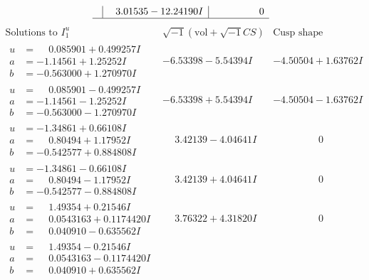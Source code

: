 \documentclass[1p]{elsarticle_modified}
\theoremstyle{definition}
\newcommand{\I}{\sqrt{-1}}
\begin{document}
$$\begin{array}{c|c|c}
 & \phantom{-}3.01535 - 12.24190 I & \phantom{-0.000000 } 0\\
 \hline 
 \end{array}$$\newpage$$\begin{array}{c|c|c}  
\text{Solutions to }I^u_{1}& \I (\text{vol} + \sqrt{-1}CS) & \text{Cusp shape}\\
 \hline 
\begin{aligned}
u &= \phantom{-}0.085901 + 0.499257 I \\
a &= -1.14561 + 1.25252 I \\
b &= -0.563000 + 1.270970 I\end{aligned}
 & -6.53398 - 5.54394 I & -4.50504 + 1.63762 I \\ \hline\begin{aligned}
u &= \phantom{-}0.085901 - 0.499257 I \\
a &= -1.14561 - 1.25252 I \\
b &= -0.563000 - 1.270970 I\end{aligned}
 & -6.53398 + 5.54394 I & -4.50504 - 1.63762 I \\ \hline\begin{aligned}
u &= -1.34861 + 0.66108 I \\
a &= \phantom{-}0.80494 + 1.17952 I \\
b &= -0.542577 + 0.884808 I\end{aligned}
 & \phantom{-}3.42139 - 4.04641 I & \phantom{-0.000000 } 0 \\ \hline\begin{aligned}
u &= -1.34861 - 0.66108 I \\
a &= \phantom{-}0.80494 - 1.17952 I \\
b &= -0.542577 - 0.884808 I\end{aligned}
 & \phantom{-}3.42139 + 4.04641 I & \phantom{-0.000000 } 0 \\ \hline\begin{aligned}
u &= \phantom{-}1.49354 + 0.21546 I \\
a &= \phantom{-}0.0543163 + 0.1174420 I \\
b &= \phantom{-}0.040910 - 0.635562 I\end{aligned}
 & \phantom{-}3.76322 + 4.31820 I & \phantom{-0.000000 } 0 \\ \hline\begin{aligned}
u &= \phantom{-}1.49354 - 0.21546 I \\
a &= \phantom{-}0.0543163 - 0.1174420 I \\
b &= \phantom{-}0.040910 + 0.635562 I\end{aligned}

\end{array}$$
\end{document}
